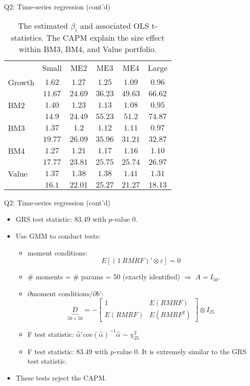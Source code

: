 \documentclass[10pt,t]{beamer}
\begin{document}
\begin{frame}{Q2: Time-series regression (cont'd)}
\begin{table}
\begin{tabular}{lccccc}
\toprule
 & Small & ME2 & ME3 & ME4 & Large \\
\cmidrule{1-6}
Growth & $1.62$ & $1.27$ & $1.25$ & $1.09$ & $0.96$\\
& $11.67$ & $24.69$ & $36.23$ & $49.63$ & $66.62$ \\
BM2 & $1.40$ & $1.23$ & $1.13$ & $1.08$ & $0.95$\\
& $14.9$ & $24.49$ & $55.23$ & $51.2$ & $74.87$ \\
BM3 & $1.37$ & $1.2$ & $1.12$ & $1.11$ & $0.97$\\
& $19.77$ & $26.09$ & $35.96$ & $31.21$ & $32.87$ \\
BM4 & $1.27$ & $1.21$ & $1.17$ & $1.16$ & $1.10$\\
& $17.77$ & $23.81$ & $25.75$ & $25.74$ & $26.97$ \\
Value & $1.37$ & $1.38$ & $1.38$ & $1.41$ & $1.31$\\
& $16.1$ & $22.01$ & $25.27$ & $21.27$ & $18.13$ \\
\bottomrule
\end{tabular}
\caption{The estimated $\beta_i$ and associated OLS t-statistics. The CAPM explain the size effect within BM3, BM4, and Value portfolio.}
\end{table}
\end{frame}

\begin{frame}{Q2: Time-series regression (cont'd)}
\begin{itemize}
  \item GRS test statistic: $83.49$ with $p$-value $0$.
  \item Use GMM to conduct tests:
  \begin{itemize}
    \item moment conditions:
    $$
    E[(1 \ RMRF)' \otimes \varepsilon] = 0
    $$
    \item \# moments = \# params = 50 (exactly identified) $\Rightarrow$ $A = I_{50}$.
    \item $\partial \text{moment conditions} / \partial b'$:
    $$
    \underbrace{D}_{50\times50} = - \left[\begin{array}{cc} 1 & E(RMRF) \\ E(RMRF) & E(RMRF^2) \end{array}\right] \otimes I_{25}
    $$
    \item F test statistic: $\hat{\alpha}' cov(\hat{\alpha})^{-1} \hat{\alpha} \sim \chi^2_{25}$
    \item F test statistic: $83.49$ with $p$-value $0$. It is extremely similar to the GRS test statistic.
  \end{itemize}
  \item These tests reject the CAPM.
\end{itemize}
\end{frame}
\end{document}
